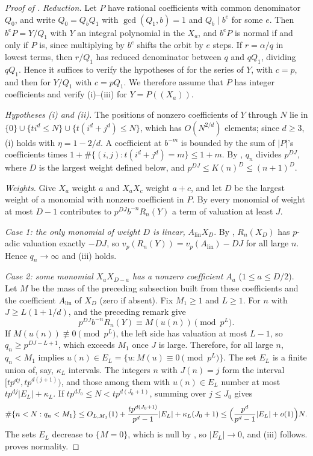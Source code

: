 \documentclass[11pt]{article}
\begin{document}
\begin{proof}[Proof of ]
\emph{Reduction.} Let $P$ have rational coefficients with common denominator $Q_0$, and write
$Q_0=Q_bQ_1$ with $\gcd(Q_1,b)=1$ and $Q_b\mid b^e$ for some $e$. Then $b^eP=Y/Q_1$ with $Y$ an integral
polynomial in the $X_a$, and $b^eP$ is normal if and only if $P$ is, since multiplying by $b^e$ shifts the
orbit by $e$ steps. If $r=\alpha/q$ in lowest terms, then $r/Q_1$ has reduced denominator between $q$ and
$qQ_1$, dividing $qQ_1$. Hence it suffices to verify the hypotheses of  for the
series of $Y$, with $c=p$, and then for $Y/Q_1$ with $c=pQ_1$. We therefore assume that $P$ has integer
coefficients and verify (i)--(iii) for $Y=P((X_a))$.

\emph{Hypotheses (i) and (ii).} The positions of nonzero coefficients of $Y$ through $N$ lie in
$\{0\}\cup\{ti^d\le N\}\cup\{t(i^d+j^d)\le N\}$, which has $O(N^{2/d})$ elements; since $d\ge3$, (i) holds
with $\eta=1-2/d$. A coefficient at $b^{-m}$ is bounded by the sum of $|P|$'s coefficients times
$1+\#\{(i,j):t(i^d+j^d)=m\}\le1+m$. By , $q_n$ divides $p^{DJ}$, where $D$ is the largest
weight defined below, and $p^{DJ}\le K(n)^D\le(n+1)^D$.

\emph{Weights.} Give $X_a$ weight $a$ and $X_aX_c$ weight $a+c$, and let $D$ be the largest weight of a
monomial with nonzero coefficient in $P$. By  every monomial of weight at most $D-1$
contributes to $p^{DJ}b^{-n}R_n(Y)$ a term of valuation at least $J$.

\emph{Case 1: the only monomial of weight $D$ is linear,} $A_{\mathrm{lin}}X_D$. By , $R_n(X_D)$
has $p$-adic valuation exactly $-DJ$, so $v_p(R_n(Y))=v_p(A_{\mathrm{lin}})-DJ$ for all large $n$. Hence
$q_n\to\infty$ and (iii) holds.

\emph{Case 2: some monomial $X_aX_{D-a}$ has a nonzero coefficient $A_a$} ($1\le a\le D/2$). Let $M$ be
the mass of the preceding subsection built from these coefficients and the coefficient
$A_{\mathrm{lin}}$ of $X_D$ (zero if absent). Fix $M_1\ge1$ and $L\ge1$. For $n$ with $J\ge L(1+1/d)$,
 and the preceding remark give
\[
p^{DJ}b^{-n}R_n(Y)\equiv M(u(n))\pmod{p^{L}} .
\]
If $M(u(n))\not\equiv0\pmod{p^{L}}$, the left side has valuation at most $L-1$, so
$q_n\ge p^{DJ-L+1}$, which exceeds $M_1$ once $J$ is large. Therefore, for all large $n$, $q_n<M_1$ implies
$u(n)\in E_L=\{u:M(u)\equiv0\pmod{p^L}\}$. The set $E_L$ is a finite union of, say, $\kappa_L$ intervals.
The integers $n$ with $J(n)=j$ form the interval $[tp^{dj},tp^{d(j+1)})$, and those among them with
$u(n)\in E_L$ number at most $tp^{dj}|E_L|+\kappa_L$. If $tp^{dJ_0}\le N<tp^{d(J_0+1)}$, summing over
$j\le J_0$ gives
\[
\#\{n<N:q_n<M_1\}\le O_{L,M_1}(1)+\frac{tp^{d(J_0+1)}}{p^d-1}|E_L|+\kappa_L(J_0+1)
\le\Bigl(\frac{p^d}{p^d-1}|E_L|+o(1)\Bigr)N .
\]
The sets $E_L$ decrease to $\{M=0\}$, which is null by , so $|E_L|\to0$, and (iii)
follows.  proves normality.


\end{proof}
\end{document}
